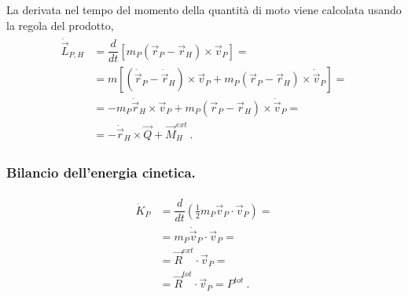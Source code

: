 \documentclass[letterpaper,10pt,italian]{jupyterBook}
\begin{document}
\sphinxAtStartPar
La derivata nel tempo del momento della quantità di moto viene calcolata usando la regola del prodotto,
\begin{equation*}
\begin{split}\begin{aligned}
\dot{\vec{L}}_{P,H} & = \dfrac{d}{dt} \left[ m_P (\vec{r}_P - \vec{r}_H) \times \vec{v}_P \right] = \\
& = m \left[ ( \dot{\vec{r}}_P - \dot{\vec{r}}_H ) \times \vec{v}_P + m_P (\vec{r}_P - \vec{r}_H) \times \dot{\vec{v}}_P \right] = \\
& = - m_P \dot{\vec{r}}_H \times \vec{v}_P + m_P (\vec{r}_P - \vec{r}_H) \times \dot{\vec{v}}_P = \\
& = - \dot{\vec{r}}_H \times \vec{Q} + \vec{M}_H^{ext} \ .
\end{aligned}\end{split}
\end{equation*}\subsubsection*{Bilancio dell’energia cinetica.}
\begin{equation*}
\begin{split}\begin{aligned}
\dot{K}_{P} & = \dfrac{d}{dt} \left( \frac{1}{2} m_P \vec{v}_P \cdot \vec{v}_P \right) = \\
            & = m_P \dot{\vec{v}}_P \cdot \vec{v}_P = \\
            & = \vec{R}^{ext} \cdot \vec{v}_P = \\
            & = \vec{R}^{tot} \cdot \vec{v}_P = P^{tot} \ .
\end{aligned}\end{split}
\end{equation*}
\end{document}
